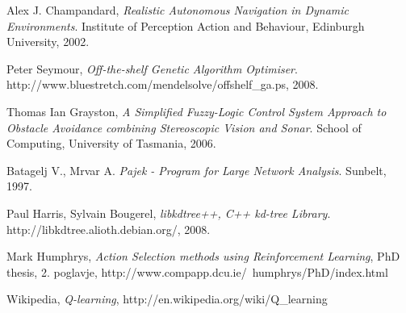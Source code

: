 \documentclass[a4paper,10pt]{article}
\begin{document}
%
%
\begin{thebibliography}{9}

  Alex J. Champandard,
  \emph{Realistic Autonomous Navigation in Dynamic Environments}.
  Institute of Perception Action and Behaviour,
  Edinburgh University,
  2002.

  Peter Seymour,
  \emph{Off-the-shelf Genetic Algorithm Optimiser}.
  http://www.bluestretch.com/mendelsolve/offshelf\_ga.ps,
  2008.

  Thomas Ian Grayston,
  \emph{A Simplified Fuzzy-Logic Control System Approach to Obstacle Avoidance combining Stereoscopic Vision and Sonar}.
  School of Computing,
  University of Tasmania,
  2006.

  Batagelj V., Mrvar A.
  \emph{Pajek - Program for Large Network Analysis}.
  Sunbelt,
  1997.

  Paul Harris, Sylvain Bougerel,
  \emph{libkdtree++, C++ kd-tree Library}.
  http://libkdtree.alioth.debian.org/,
  2008.

  Mark Humphrys,
  \emph{Action Selection methods using Reinforcement Learning},
  PhD thesis, 2. poglavje,
  http://www.compapp.dcu.ie/~humphrys/PhD/index.html

  Wikipedia,
  \emph{Q-learning},
  http://en.wikipedia.org/wiki/Q\_learning

\end{thebibliography}
\end{document}
